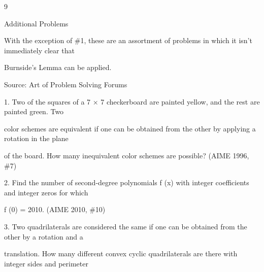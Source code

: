 \documentclass[a4paper,portrait,12pt]{article}
\begin{document}
9





\begin{flushleft}
Additional Problems
\end{flushleft}





\begin{flushleft}
With the exception of \#1, these are an assortment of problems in which it isn't immediately clear that
\end{flushleft}


\begin{flushleft}
Burnside's Lemma can be applied.
\end{flushleft}


\begin{flushleft}
Source: Art of Problem Solving Forums
\end{flushleft}


\begin{flushleft}
1. Two of the squares of a 7 × 7 checkerboard are painted yellow, and the rest are painted green. Two
\end{flushleft}


\begin{flushleft}
color schemes are equivalent if one can be obtained from the other by applying a rotation in the plane
\end{flushleft}


\begin{flushleft}
of the board. How many inequivalent color schemes are possible? (AIME 1996, \#7)
\end{flushleft}


\begin{flushleft}
2. Find the number of second-degree polynomials f (x) with integer coefficients and integer zeros for which
\end{flushleft}


\begin{flushleft}
f (0) = 2010. (AIME 2010, \#10)
\end{flushleft}


\begin{flushleft}
3. Two quadrilaterals are considered the same if one can be obtained from the other by a rotation and a
\end{flushleft}


\begin{flushleft}
translation. How many different convex cyclic quadrilaterals are there with integer sides and perimeter
\end{flushleft}
\end{document}
